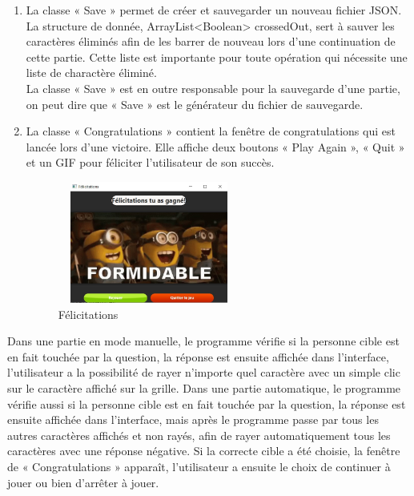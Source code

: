 \documentclass[a4paper]{article}
\begin{document}
\begin{enumerate}
    \item La classe « Save » permet de créer et sauvegarder un nouveau fichier JSON.\\
    La structure de donnée, ArrayList<Boolean> crossedOut, sert à sauver les caractères éliminés afin de les barrer de nouveau lors d’une continuation de cette partie. Cette liste est importante pour toute opération qui nécessite une liste de charactère éliminé.\\
    La classe « Save » est en outre responsable pour la sauvegarde d’une partie, on peut dire que « Save » est le générateur du fichier de sauvegarde.\\
    
    \item La classe « Congratulations » contient la fenêtre de congratulations qui est lancée lors d’une victoire. Elle affiche deux boutons « Play Again », « Quit » et un GIF pour féliciter l’utilisateur de son succès.\\
    \begin{figure}[h!]
        \centering
        \includegraphics[width= 6cm, height=4cm]{win scene.jpg}
        \caption{Félicitations}
    \end{figure}
    
\end{enumerate}
Dans une partie en mode manuelle, le programme vérifie si la personne cible est en fait touchée par la question, la réponse est ensuite affichée dans l’interface, l'utilisateur a la possibilité de rayer n’importe quel caractère avec un simple clic sur le caractère affiché sur la grille.
Dans une partie automatique, le programme vérifie aussi si la personne cible est en fait touchée par la question, la réponse est ensuite affichée dans l’interface, mais après le programme passe par tous les autres caractères affichés et non rayés, afin de rayer automatiquement tous les caractères avec une réponse négative.
Si la correcte cible a été choisie, la fenêtre de « Congratulations » apparaît, l’utilisateur a ensuite le choix de continuer à jouer ou bien d'arrêter à jouer.
\end{document}
